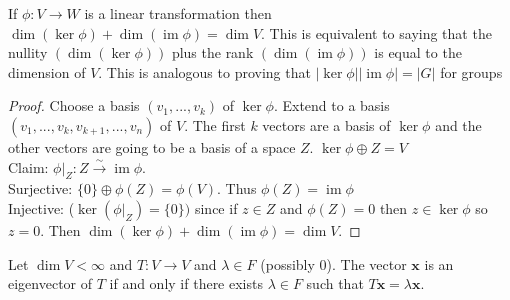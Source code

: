 \documentclass{article}
\newcommand{\ra}[1][]{\xrightarrow{#1}}
\DeclareMathOperator{\im}{im}
\begin{document}
\begin{theorem}
If $\phi:V\ra W$ is a linear transformation then $\dim(\ker\phi)+\dim(\im\phi)=\dim V$. This is equivalent to saying that the nullity $(\dim(\ker\phi))$ plus the rank $(\dim(\im\phi))$ is equal to the dimension of $V$. This is analogous to proving that $|\ker\phi||\im\phi|=|G|$ for groups
\end{theorem}
\begin{proof}
Choose a basis $(v_1,...,v_k)$ of $\ker\phi$. Extend to a basis $(v_1,...,v_k,v_{k+1},...,v_n)$ of $V$. The first $k$ vectors are a basis of $\ker\phi$ and the other vectors are going to be a basis of a space $Z$. $\ker\phi\oplus Z=V$\\
Claim: $\phi|_Z:Z\ra[\sim] \im\phi$. \\
Surjective: $\{0\}\oplus\phi(Z)=\phi(V)$. Thus $\phi(Z)=\im\phi$\\
Injective: ($\ker(\phi|_Z)=\{0\})$ since if $z\in Z$ and $\phi(Z)=0$ then $z\in \ker\phi$ so $z=0$. Then $\dim(\ker\phi)+\dim(\im\phi)=\dim V$.
\end{proof}
\begin{definition}[Eigenvector]
Let $\dim V<\infty$ and $T:V\ra V$ and $\lambda\in F$ (possibly 0). The vector $\mathbf{x}$ is an eigenvector of $T$ if and only if there exists $\lambda\in F$ such that $T\mathbf{x}=\lambda\mathbf{x}$.
\end{definition}
\end{document}
